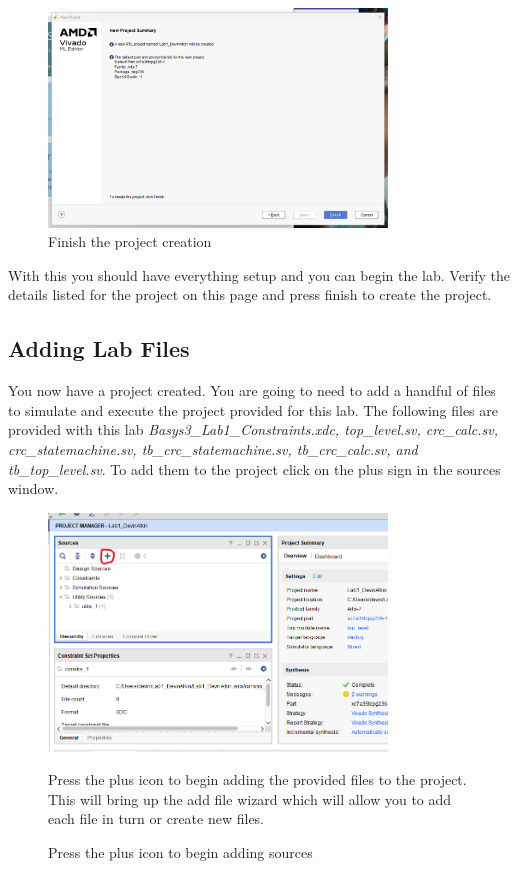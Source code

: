     \begin{figure}[H]
        \centering
        \includegraphics[width=9cm]{Images/CreateProjectImages/Vivado_CreateProject_Page5.png}
        \caption{Finish the project creation}
        \label{fig:enter-label}
    \end{figure}
    With this you should have everything setup and you can begin the lab. Verify the details listed for the project on this page and press finish to create the project. 
\else
\fi

\subsection{Adding Lab Files}
You now have a project created. You are going to need to add a handful of files to simulate and execute the project provided for this lab. The following files are provided with this lab \textit{Basys3\_Lab1\_Constraints.xdc, top\_level.sv, crc\_calc.sv, crc\_statemachine.sv, tb\_crc\_statemachine.sv, tb\_crc\_calc.sv, and tb\_top\_level.sv}. To add them to the project click on the plus sign in the sources window.

\ifpdf
    \begin{figure}[H]
        \centering
        \includegraphics[width=9cm]{Images/CreateBitstreamImages/Vivado_AddSources1.png}
        \caption{Press the plus icon to begin adding sources}
        \label{fig:enter-label}
        \raggedright
        \vspace{0.5cm}
        Press the plus icon to begin adding the provided files to the project. This will bring up the add file wizard which will allow you to add each file in turn or create new files.

    \end{figure}
    
